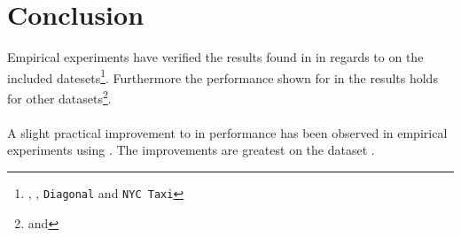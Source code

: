 \section{Conclusion}
\label{conclusion}
Empirical experiments have verified the results found in \cite{wagner17} in regards to \qs{} on the included datesets\footnote{\mnist{}, \sift{}, \texttt{Diagonal} and \texttt{NYC Taxi}}. Furthermore the performance shown for \qs{} in the results holds for other datasets\footnote{\gist{} and \clust{}}.
\\
\\
A slight practical improvement to \qs{} in performance has been observed in empirical experiments using \qsr{}. The improvements are greatest on the dataset \mnist{}.
